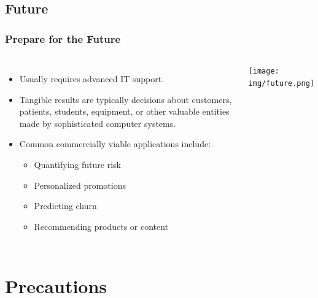 \documentclass[11pt,
               aspectratio=169
               ]{beamer}
\begin{document}
	\subsection{Future}

		\begin{frame}
		
			\frametitle{Prepare for the Future}
			
			\begin{columns}
					
				\begin{itemize}
				\item Usually requires advanced IT support.
				\item Tangible results are typically decisions about customers, patients, students, equipment, or other valuable entities made by sophisticated computer systems.
				\item Common commercially viable applications include:
					\begin{itemize}
						\item Quantifying future risk
						\item Personalized promotions
						\item Predicting churn 
						\item Recommending products or content
					\end{itemize}
				\end{itemize}
				\centering
				\texttt{[image: img/future.png]}
				
			\end{columns}
		
		\end{frame}		
				
	\section{Precautions}
		
\end{document}

